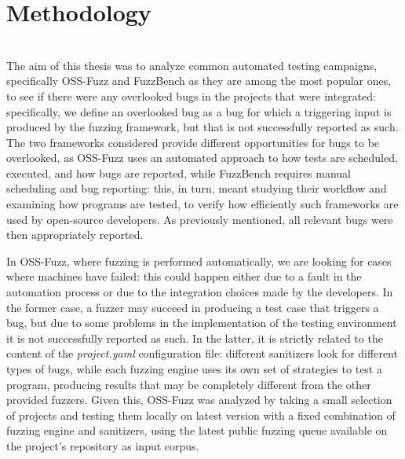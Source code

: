 \chapter{Methodology} \label{chap_3}
\ \\

The aim of this thesis was to analyze common automated testing campaigns, specifically OSS-Fuzz and FuzzBench as they are among the most popular ones, to see if there were any overlooked bugs in the projects that were integrated: specifically, we define an overlooked bug as a bug for which a triggering input is produced by the fuzzing framework, but that is not successfully reported as such. The two frameworks considered provide different opportunities for bugs to be overlooked, as OSS-Fuzz uses an automated approach to how tests are scheduled, executed, and how bugs are reported, while FuzzBench requires manual scheduling and bug reporting: this, in turn, meant studying their workflow and examining how programs are tested, to verify how efficiently such frameworks are used by open-source developers.
As previously mentioned, all relevant bugs were then appropriately reported.

In OSS-Fuzz, where fuzzing is performed automatically, we are looking for cases where machines have failed: this could happen either due to a fault in the automation process or due to the integration choices made by the developers. In the former case, a fuzzer may succeed in producing a test case that triggers a bug, but due to some problems in the implementation of the testing environment it is not successfully reported as such. In the latter, it is strictly related to the content of the \textit{project.yaml} configuration file: different sanitizers look for different types of bugs, while each fuzzing engine uses its own set of strategies to test a program, producing results that may be completely different from the other provided fuzzers. Given this, OSS-Fuzz was analyzed by taking a small selection of projects and testing them locally on latest version with a fixed combination of fuzzing engine and sanitizers, using the latest public fuzzing queue available on the project's repository as input corpus. 

